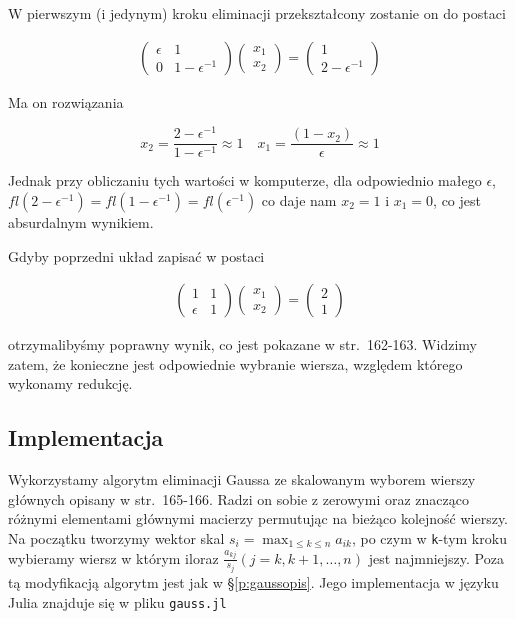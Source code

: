 \documentclass[11pt,wide]{mwart}
\begin{document}
\noindent W pierwszym (i jedynym) kroku eliminacji przekształcony zostanie on do postaci

\begin{align*}
\left(\begin{matrix}
\epsilon & 1	\\
 0 & 1 - \epsilon^{-1}
\end{matrix}\right)
\left(\begin{matrix}
x_1 \\ x_2
\end{matrix}\right) = 
\left(\begin{matrix}
1 \\ 2 - \epsilon^{-1}
\end{matrix}\right)
\end{align*}

\noindent Ma on rozwiązania 

$$ 
x_2 = \frac{2 - \epsilon^{-1}}{1 - \epsilon^{-1}} \approx 1 \quad x_1 = \frac{(1 - x_2)}{\epsilon} \approx 1
$$

\noindent Jednak przy obliczaniu tych wartości w komputerze, dla odpowiednio małego $ \epsilon $,  $ fl(2 - \epsilon^{-1}) = fl(1 - \epsilon^{-1}) = fl(\epsilon^{-1}) $ co daje nam $ x_2 = 1 $ i $ x_1 = 0 $, co jest absurdalnym wynikiem.

Gdyby poprzedni układ zapisać w postaci

\begin{align*}
\left(\begin{matrix}
       1 & 1 \\
\epsilon & 1
\end{matrix}\right)
\left(\begin{matrix}
x_1 \\ x_2
\end{matrix}\right) = 
\left(\begin{matrix}
2 \\ 1
\end{matrix}\right)
\end{align*}

\noindent otrzymalibyśmy poprawny wynik, co jest pokazane w \cite{kincaid} str.~162-163. Widzimy zatem, że konieczne jest odpowiednie wybranie wiersza, względem którego wykonamy redukcję.

\subsection{Implementacja}

Wykorzystamy algorytm eliminacji Gaussa ze skalowanym wyborem wierszy głównych opisany w \cite{kincaid} str.~165-166. Radzi on sobie z zerowymi oraz znacząco różnymi elementami głównymi macierzy permutując na bieżąco kolejność wierszy. Na początku tworzymy wektor skal $ s_i = \max_{1 \leq k \leq n}a_{ik} $, po czym w \texttt{k}-tym kroku wybieramy wiersz w którym iloraz $ \frac{a_{kj}}{s_j} (j = k, k+1, \ldots,n)$ jest najmniejszy. Poza tą modyfikacją algorytm jest jak w \S\ref{p:gaussopis}. Jego implementacja w języku Julia znajduje się w pliku \texttt{gauss.jl}
\end{document}

